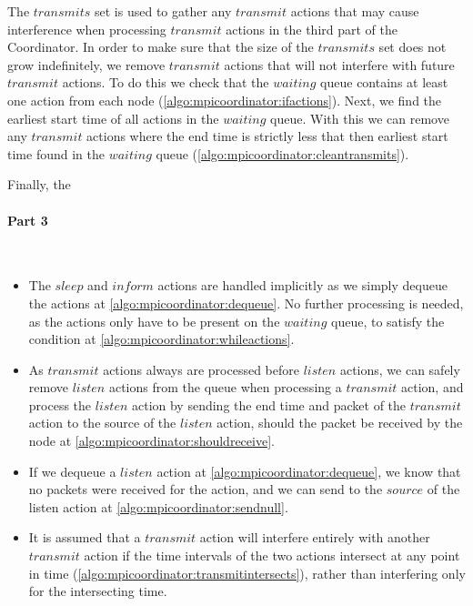 The $transmits$ set is used to gather any $transmit$ actions that may cause interference when processing $transmit$ actions in the third part of the Coordinator. In order to make sure that the size of the $transmits$ set does not grow indefinitely, we remove $transmit$ actions that will not interfere with future $transmit$ actions. To do this we check that the $waiting$ queue contains at least one action from each node (\autoref{algo:mpicoordinator:ifactions}). Next, we find the earliest start time of all actions in the $waiting$ queue. With this we can remove any $transmit$ actions where the end time is strictly less that then earliest start time found in the $waiting$ queue (\autoref{algo:mpicoordinator:cleantransmits}). \smallbreak

Finally, the 

\paragraph{Part 3} \

\begin{itemize}
    \item The $sleep$ and $inform$ actions are handled implicitly as we simply dequeue the actions at \autoref{algo:mpicoordinator:dequeue}. No further processing is needed, as the actions only have to be present on the $waiting$ queue, to satisfy the condition at \autoref{algo:mpicoordinator:whileactions}.
    \item As $transmit$ actions always are processed before $listen$ actions, we can safely remove $listen$ actions from the queue when processing a $transmit$ action, and process the $listen$ action by sending the end time and packet of the $transmit$ action to the source of the $listen$ action, should the packet be received by the node at \autoref{algo:mpicoordinator:shouldreceive}.
    \item If we dequeue a $listen$ action at \autoref{algo:mpicoordinator:dequeue}, we know that no packets were received for the action, and we can send \KwNull to the $source$ of the listen action at \autoref{algo:mpicoordinator:sendnull}.
    \item It is assumed that a $transmit$ action will interfere entirely with another $transmit$ action if the time intervals of the two actions intersect at any point in time (\autoref{algo:mpicoordinator:transmitintersects}), rather than interfering only for the intersecting time.
\end{itemize}



